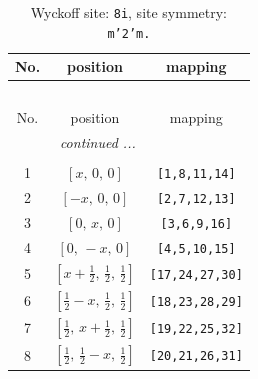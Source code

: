 \documentclass[fleqn,8pt]{jsarticle}
\begin{document}
\begin{longtable}{ccc}
\caption{Wyckoff site: {\tt 8i}, site symmetry: {\tt m'2'm.}}
 \\
 \hline \hline
No. & position & mapping \\ \hline \endfirsthead

\multicolumn{2}{l}{\tablename\ \thetable{}} \\
 \hline \hline
No. & position & mapping \\ \hline \endhead

 \hline \hline
\multicolumn{2}{r}{\footnotesize\it continued ...} \\ \endfoot

 \hline \hline
\multicolumn{2}{r}{} \\ \endlastfoot

1 & $\left[ x,\, 0,\, 0 \right]$ & {\tt [1,8,11,14]} \\ \hline
2 & $\left[ - x,\, 0,\, 0 \right]$ & {\tt [2,7,12,13]} \\ \hline
3 & $\left[ 0,\, x,\, 0 \right]$ & {\tt [3,6,9,16]} \\ \hline
4 & $\left[ 0,\, - x,\, 0 \right]$ & {\tt [4,5,10,15]} \\ \hline
5 & $\left[ x + \frac{1}{2},\, \frac{1}{2},\, \frac{1}{2} \right]$ & {\tt [17,24,27,30]} \\ \hline
6 & $\left[ \frac{1}{2} - x,\, \frac{1}{2},\, \frac{1}{2} \right]$ & {\tt [18,23,28,29]} \\ \hline
7 & $\left[ \frac{1}{2},\, x + \frac{1}{2},\, \frac{1}{2} \right]$ & {\tt [19,22,25,32]} \\ \hline
8 & $\left[ \frac{1}{2},\, \frac{1}{2} - x,\, \frac{1}{2} \right]$ & {\tt [20,21,26,31]} \\
\end{longtable}
\renewcommand{\arraystretch}{1.2}
\end{document}
